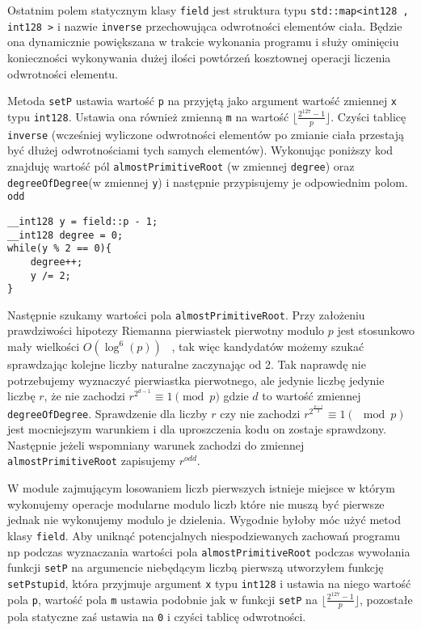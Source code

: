 \documentclass{article}
\begin{document}
Ostatnim polem statycznym klasy \texttt{field} jest struktura typu 
\texttt{std::map<\textunderscore \textunderscore int128 , \textunderscore \textunderscore int128 >} i nazwie 
\texttt{inverse} przechowująca odwrotności elementów ciała. Będzie ona dynamicznie powiększana w trakcie wykonania 
programu i służy ominięciu konieczności wykonywania dużej ilości powtórzeń kosztownej operacji liczenia odwrotności
elementu. 



Metoda \texttt{setP} ustawia wartość 
\texttt{p} na przyjętą jako argument wartość zmiennej \texttt{x} typu 
\texttt{\textunderscore \textunderscore int128}. 
Ustawia ona również zmienną \texttt{m} na wartość $\lfloor \frac{2^{127}-1}{p} \rfloor$.
Czyści tablicę \texttt{inverse} (wcześniej wyliczone odwrotności elementów
po zmianie ciała przestają być dłużej odwrotnościami tych samych elementów).
Wykonując poniższy kod znajduję wartość pól \texttt{almostPrimitiveRoot} (w zmiennej \texttt{degree}) oraz 
\texttt{degreeOfDegree}(w zmiennej \texttt{y}) i następnie przypisujemy je odpowiednim polom.
\texttt{odd}
\begin{verbatim}
__int128 y = field::p - 1;
__int128 degree = 0;
while(y % 2 == 0){
    degree++;
    y /= 2;
}
\end{verbatim}

Następnie szukamy wartości pola \texttt{almostPrimitiveRoot}. 
Przy założeniu prawdziwości hipotezy Riemanna pierwiastek pierwotny modulo $p$ jest
stosunkowo mały wielkości $O(\log^6(p))$ ~\cite{durnoga2017large}, 
tak więc kandydatów możemy szukać sprawdzając kolejne liczby naturalne zaczynając od 2. 
Tak naprawdę nie potrzebujemy wyznaczyć pierwiastka pierwotnego, ale jedynie liczbę jedynie liczbę 
$r$, że nie zachodzi $r^{2^{d-1}} \equiv 1 \pmod p$ gdzie $d$ to wartość zmiennej \texttt{degreeOfDegree}. Sprawdzenie dla liczby $r$ czy nie zachodzi 
$r^{2^\frac{p-1}{2}} \equiv 1 (\mod p)$ jest mocniejszym warunkiem i dla uproszczenia kodu on zostaje sprawdzony. Następnie
jeżeli wspomniany warunek zachodzi do zmiennej \texttt{almostPrimitiveRoot} zapisujemy $r^{odd}$.

W module zajmującym losowaniem liczb pierwszych istnieje miejsce w którym wykonujemy operacje modularne modulo liczb
które nie muszą być pierwsze jednak nie wykonujemy modulo je dzielenia. Wygodnie byłoby móc użyć metod klasy 
\texttt{field}. Aby uniknąć potencjalnych niespodziewanych zachowań programu np podczas wyznaczania wartości pola 
\texttt{almostPrimitiveRoot} podczas wywołania funkcji \texttt{setP} na 
argumencie niebędącym liczbą pierwszą utworzyłem funkcję \texttt{setPstupid}, która przyjmuje argument
\texttt{x} typu \texttt{\textunderscore \textunderscore int128} i ustawia na niego wartość
pola \texttt{p}, wartość pola \texttt{m} ustawia podobnie jak w funkcji \texttt{setP} na  
$\lfloor \frac{2^{127}-1}{p} \rfloor$, pozostałe pola statyczne zaś ustawia na \texttt{0} i czyści tablicę odwrotności.
\end{document}
